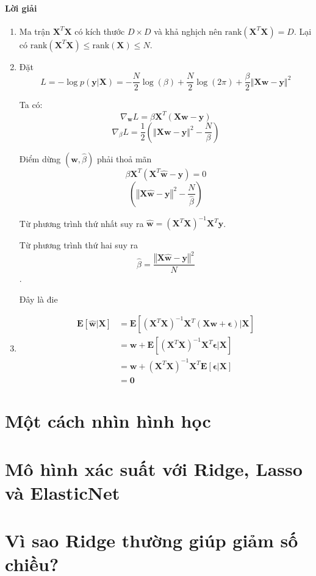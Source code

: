 \documentclass{article}
\let\mb\mathbf
\begin{document}
\paragraph{Lời giải}
\begin{enumerate}
	\item Ma trận $\mb X^T \mb X$ có kích thước $D\times D$ và khả nghịch nên $\mathrm{rank}(\mb X^T \mb X) = D$. Lại có $\mathrm{rank} (\mb X^T \mb X) \leq \mathrm{rank}(\mb X) \leq N$. 
	\item Đặt
	$$
	L = -\log p(\mb y| \mb X) = -\frac N 2 \log(\beta) + \frac N 2 \log(2\pi) + \frac{\beta  }{2} \left\Vert \mb X \mb w - \mb y \right\Vert^2 
	$$
	
	Ta có:
	$$
	\nabla_{\mb w} L = \beta \mb X^T (\mb X \mb w - \mb y)
	$$
	$$
	\nabla_\beta L = \frac12\left( \left\Vert \mb X \mb w - \mb y \right\Vert^2 - \frac {N}{\beta} \right)
	$$
	
	Điểm dừng $(\hat{\mb w}, \hat \beta)$ phải thoả mãn 
	$$
	\beta \mb X^T (\mb X^T \hat{\mb w} - \mb y) = 0
	$$
	$$
	\left( \left\Vert \mb X \hat{\mb w} - \mb y \right\Vert^2 - \frac {N} {\hat{\beta}} \right)
	$$
	
	Từ phương trình thứ nhất suy ra $\hat{\mb w} = (\mb X^T \mb X)^{-1} \mb X^T \mb y$.
	
	Từ phương trình thứ hai suy ra $$\hat{\beta} = \frac{\left\Vert \mb X \hat{\mb w} - \mb y \right\Vert^2}{N}$$.
	
	Đây là đie
	\item 
	\begin{align}
	\mb E[\hat{\mb w} | \mb X] &= \mb E [(\mb X^T \mb X)^{-1}\mb X^T (\mb X \mb w + \mb \epsilon) | \mb X] \nonumber \\
	&= \mb w + \mb E [(\mb X^T \mb X)^{-1} \mb X^T \mb \epsilon | \mb X] \nonumber \\
	&= \mb w + (\mb X^T \mb X)^{-1}  \mb X^T \mb E [\mb \epsilon | \mb X] \nonumber \\
	&= \mb 0
	\end{align}
	
\end{enumerate}

\section{Một cách nhìn hình học}



\section{Mô hình xác suất với Ridge, Lasso và ElasticNet}

\section{Vì sao Ridge thường giúp giảm số chiều?}
\end{document}
